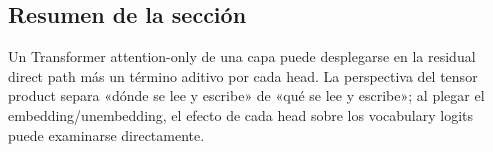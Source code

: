 
\subsection{Resumen de la sección}

Un Transformer attention-only de una capa puede desplegarse en la residual direct path más un término aditivo por cada head. La perspectiva del tensor product separa «dónde se lee y escribe» de «qué se lee y escribe»; al plegar el embedding/unembedding, el efecto de cada head sobre los vocabulary logits puede examinarse directamente.
